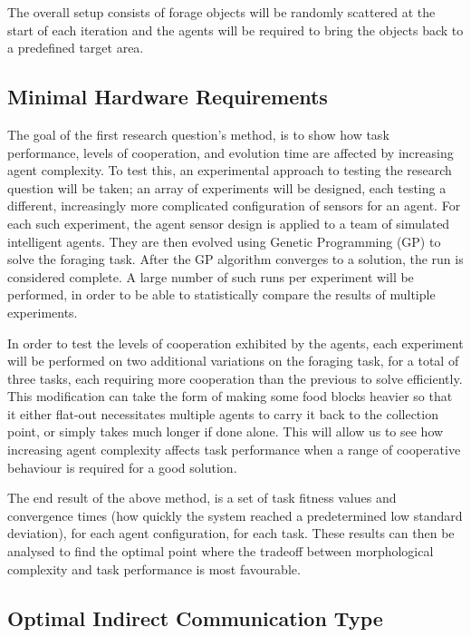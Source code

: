 \documentclass[a4paper,12pt]{article}
\begin{document}
The overall setup consists of forage objects will be randomly scattered at the start of each iteration and the agents will be required to bring the objects back to a predefined target area.

\subsection{Minimal Hardware Requirements}
The goal of the first research question's method, is to show how task performance, levels of cooperation, and evolution time are affected by increasing agent complexity. To test this, an experimental approach to testing the research question will be taken; an array of experiments will be designed, each testing a different, increasingly more complicated configuration of sensors for an agent. For each such experiment, the agent sensor design is applied to a team of simulated intelligent agents. They are then evolved using Genetic Programming (GP)\cite{Koza90} to solve the foraging task. After the GP algorithm converges to a solution, the run is considered complete. A large number of such runs per experiment will be performed, in order to be able to statistically compare the results of multiple experiments.

In order to test the levels of cooperation exhibited by the agents, each experiment will be performed on two additional variations on the foraging task, for a total of three tasks, each requiring more cooperation than the previous to solve efficiently. This modification can take the form of making some food blocks heavier so that it either flat-out necessitates multiple agents to carry it back to the collection point, or simply takes much longer if done alone.
This will allow us to see how increasing agent complexity affects task performance when a range of cooperative behaviour is required for a good solution.

The end result of the above method, is a set of task fitness values and convergence times (how quickly the system reached a predetermined low standard deviation), for each agent configuration, for each task. These results can then be analysed to find the optimal point where the tradeoff between morphological complexity and task performance is most favourable.

\subsection{Optimal Indirect Communication Type}
\end{document}
